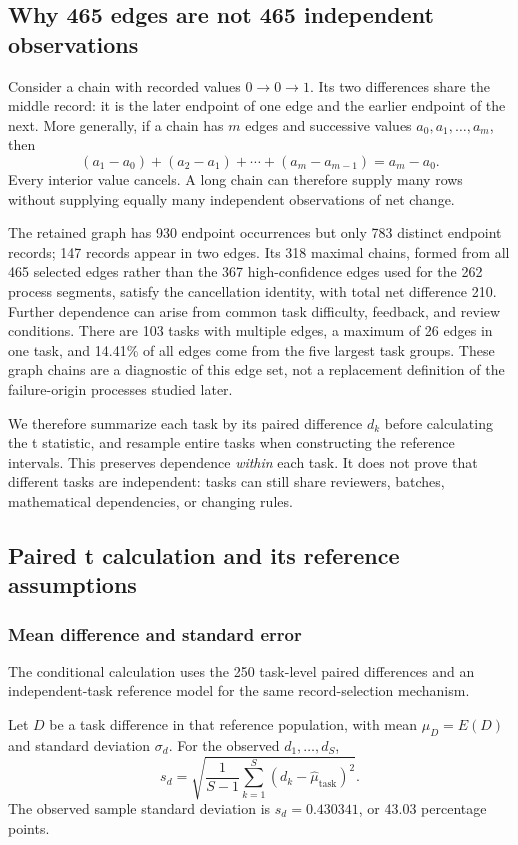 \subsection{Why 465 edges are not 465 independent observations}
\label{subsec:edge-dependence}
Consider a chain with recorded values $0\to0\to1$. Its two differences share the middle record: it is the later endpoint of one edge and the earlier endpoint of the next. More generally, if a chain has $m$ edges and successive values $a_0,a_1,\ldots,a_m$, then
\[
(a_1-a_0)+(a_2-a_1)+\cdots+(a_m-a_{m-1})=a_m-a_0.
\]
Every interior value cancels. A long chain can therefore supply many rows without supplying equally many independent observations of net change.

The retained graph has 930 endpoint occurrences but only 783 distinct endpoint records; 147 records appear in two edges. Its 318 maximal chains, formed from all 465 selected edges rather than the 367 high-confidence edges used for the 262 process segments, satisfy the cancellation identity, with total net difference 210. Further dependence can arise from common task difficulty, feedback, and review conditions. There are 103 tasks with multiple edges, a maximum of 26 edges in one task, and 14.41\% of all edges come from the five largest task groups. These graph chains are a diagnostic of this edge set, not a replacement definition of the failure-origin processes studied later.

We therefore summarize each task by its paired difference $d_k$ before calculating the t statistic, and resample entire tasks when constructing the reference intervals. This preserves dependence \emph{within} each task. It does not prove that different tasks are independent: tasks can still share reviewers, batches, mathematical dependencies, or changing rules.

\subsection{Paired t calculation and its reference assumptions}
\label{subsec:paired-t-explanation}
\subsubsection{Mean difference and standard error}
The conditional calculation uses the 250 task-level paired differences and an independent-task reference model for the same record-selection mechanism.

Let $D$ be a task difference in that reference population, with mean $\mu_D=E(D)$ and standard deviation $\sigma_d$. For the observed $d_1,\ldots,d_S$,
\[
s_d=\sqrt{\frac{1}{S-1}\sum_{k=1}^{S}(d_k-\widehat\mu_{\mathrm{task}})^2}.
\]
The observed sample standard deviation is $s_d=0.430341$, or 43.03 percentage points.

